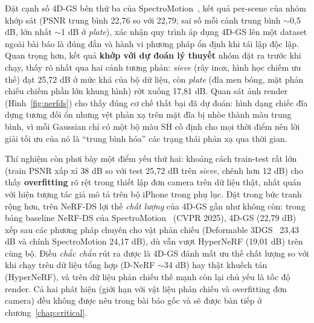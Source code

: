 \documentclass[a4paper]{report}
\begin{document}
Đặt cạnh số 4D-GS bên thứ ba của SpectroMotion~\cite{spectromotion}, kết quả
per-scene của nhóm khớp sát (PSNR trung bình 22,76 so với 22,79; sai số mỗi cảnh
trung bình $\sim$0,5 dB, lớn nhất $\sim$1 dB ở \textit{plate}), xác nhận quy trình áp dụng 4D-GS lên một
dataset ngoài bài báo là đúng đắn và hành vi phương pháp ổn định khi tái lập độc
lập. Quan trọng hơn, kết quả \textbf{khớp với dự đoán lý thuyết} nhóm đặt ra trước
khi chạy, thấy rõ nhất qua hai cảnh tương phản: \textit{sieve} (rây inox, hình học
chiếm ưu thế) đạt 25,72 dB ở mức khá của bộ dữ liệu, còn \textit{plate} (đĩa men
bóng, mặt phản chiếu chiếm phần lớn khung hình) rớt xuống 17,81 dB. Quan sát ảnh
render (Hình~\ref{fig:nerfds}) cho thấy đúng cơ chế thất bại đã dự đoán: hình dạng
chiếc đĩa dựng tương đối ổn nhưng vệt phản xạ trên mặt đĩa bị nhòe thành màu trung
bình, vì mỗi Gaussian chỉ có một bộ màu SH cố định cho mọi thời điểm nên lời giải
tối ưu của nó là ``trung bình hóa'' các trạng thái phản xạ qua thời gian.

Thí nghiệm còn phơi bày một điểm yếu thứ hai: khoảng cách train-test rất lớn
(train PSNR xấp xỉ 38 dB so với test 25,72 dB trên \textit{sieve}, chênh hơn
12 dB) cho thấy
\textbf{overfitting} rõ rệt trong thiết lập đơn camera trên dữ liệu thật, nhất
quán với hiện tượng tác giả mô tả trên bộ iPhone trong phụ lục. Đặt trong bức
tranh rộng hơn, trên NeRF-DS lợi thế \textit{chất lượng} của 4D-GS gần như không
còn: trong bảng baseline NeRF-DS của SpectroMotion~\cite{spectromotion} (CVPR 2025),
4D-GS (22,79 dB) xếp sau các phương pháp chuyên cho vật phản chiếu (Deformable 3DGS~\cite{deformable3dgs}
23,43 dB và chính SpectroMotion 24,17 dB), dù vẫn vượt HyperNeRF (19,01 dB) trên cùng
bộ. Điều \textit{chắc chắn} rút ra được là 4D-GS đánh mất ưu thế chất lượng so với khi chạy trên dữ liệu
tổng hợp (D-NeRF $\sim$34 dB) hay thật khuếch tán (HyperNeRF), và trên dữ liệu phản
chiếu thế mạnh còn lại chủ yếu là tốc độ render. Cả hai phát hiện (giới hạn với
vật liệu phản chiếu và overfitting đơn camera) đều không được nêu trong bài báo
gốc và sẽ được bàn tiếp ở chương~\ref{chap:critical}.
\end{document}
